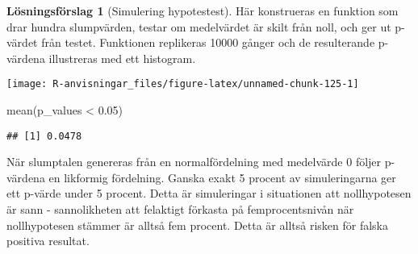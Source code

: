 \documentclass[
]{book}
\newenvironment{Shaded}{\begin{snugshade}}{\end{snugshade}}
\newcommand{\AttributeTok}[1]{\textcolor[rgb]{0.77,0.63,0.00}{#1}}
\newcommand{\ControlFlowTok}[1]{\textcolor[rgb]{0.13,0.29,0.53}{\textbf{#1}}}
\newcommand{\DecValTok}[1]{\textcolor[rgb]{0.00,0.00,0.81}{#1}}
\newcommand{\FloatTok}[1]{\textcolor[rgb]{0.00,0.00,0.81}{#1}}
\newcommand{\FunctionTok}[1]{\textcolor[rgb]{0.00,0.00,0.00}{#1}}
\newcommand{\NormalTok}[1]{#1}
\newcommand{\OtherTok}[1]{\textcolor[rgb]{0.56,0.35,0.01}{#1}}
\newcommand{\SpecialCharTok}[1]{\textcolor[rgb]{0.00,0.00,0.00}{#1}}
\theoremstyle{definition}
\theoremstyle{definition}
\theoremstyle{definition}
\theoremstyle{definition}
\newtheorem{hypothesis}{Lösningsförslag}[chapter]
\theoremstyle{remark}
\begin{document}
\begin{hypothesis}[Simulering hypotestest]
Här konstrueras en funktion som drar hundra slumpvärden, testar om medelvärdet är skilt från noll, och ger ut p-värdet från testet. Funktionen replikeras 10000 gånger och de resulterande p-värdena illustreras med ett histogram.

\begin{Shaded}
\end{Shaded}

\begin{center}\texttt{[image: R-anvisningar\_files/figure-latex/unnamed-chunk-125-1]} \end{center}

\begin{Shaded}
\begin{Highlighting}[]
\FunctionTok{mean}\NormalTok{(p\_values }\SpecialCharTok{\textless{}} \FloatTok{0.05}\NormalTok{)}
\end{Highlighting}
\end{Shaded}

\begin{verbatim}
## [1] 0.0478
\end{verbatim}

När slumptalen genereras från en normalfördelning med medelvärde 0 följer p-värdena en likformig fördelning. Ganska exakt 5 procent av simuleringarna ger ett p-värde under 5 procent. Detta är simuleringar i situationen att nollhypotesen är sann - sannolikheten att felaktigt förkasta på femprocentsnivån när nollhypotesen stämmer är alltså fem procent. Detta är alltså risken för falska positiva resultat.


\end{hypothesis}
\end{document}
